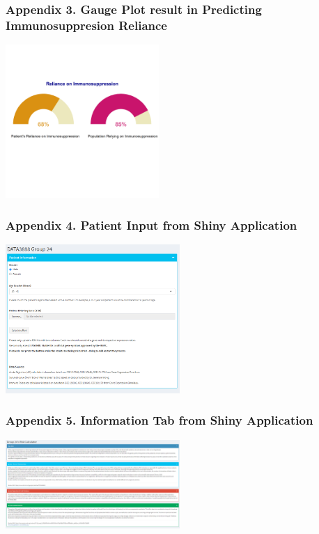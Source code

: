 \documentclass[a4paper,9pt,twocolumn,twoside,]{pinp}
\begin{document}
\hypertarget{appendix-3.-gauge-plot-result-in-predicting-immunosuppresion-reliance}{%
\subsubsection{Appendix 3. Gauge Plot result in Predicting
Immunosuppresion
Reliance}\label{appendix-3.-gauge-plot-result-in-predicting-immunosuppresion-reliance}}

\begin{center}\includegraphics[width=220px]{images/part3_gauge} \end{center}

\newpage

\hypertarget{appendix-4.-patient-input-from-shiny-application}{%
\subsubsection{Appendix 4. Patient Input from Shiny
Application}\label{appendix-4.-patient-input-from-shiny-application}}

\begin{center}\includegraphics[width=250px]{images/PatientInput} \end{center}

\hypertarget{appendix-5.-information-tab-from-shiny-application}{%
\subsubsection{Appendix 5. Information Tab from Shiny
Application}\label{appendix-5.-information-tab-from-shiny-application}}

\begin{center}\includegraphics[width=250px]{images/Information} \end{center}





\end{document}
